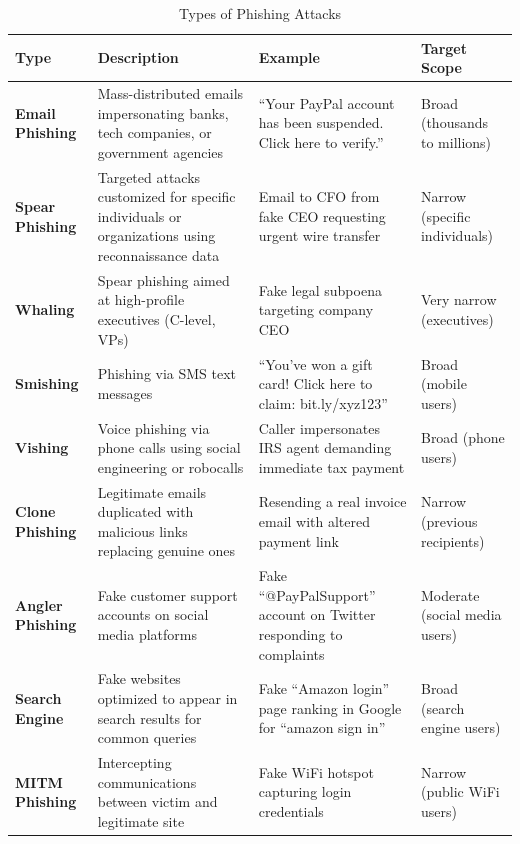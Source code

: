 \setlength{\tabcolsep}{4pt}
\small
\begin{longtable}{
>{\raggedright\arraybackslash}p{}
>{\raggedright\arraybackslash}p{}
>{\raggedright\arraybackslash}p{}
>{\raggedright\arraybackslash}p{}}
\caption{Types of Phishing Attacks} \\
\toprule
Type & Description & Example & Target Scope \\
\midrule

\textbf{Email Phishing} & Mass-distributed emails impersonating banks,
tech companies, or government agencies & ``Your PayPal account has been
suspended. Click here to verify.'' & Broad (thousands to millions) \\
\textbf{Spear Phishing} & Targeted attacks customized for specific
individuals or organizations using reconnaissance data & Email to CFO
from fake CEO requesting urgent wire transfer & Narrow (specific
individuals) \\
\textbf{Whaling} & Spear phishing aimed at high-profile executives
(C-level, VPs) & Fake legal subpoena targeting company CEO & Very narrow
(executives) \\
\textbf{Smishing} & Phishing via SMS text messages & ``You've won a gift
card! Click here to claim: bit.ly/xyz123'' & Broad (mobile users) \\
\textbf{Vishing} & Voice phishing via phone calls using social
engineering or robocalls & Caller impersonates IRS agent demanding
immediate tax payment & Broad (phone users) \\
\textbf{Clone Phishing} & Legitimate emails duplicated with malicious
links replacing genuine ones & Resending a real invoice email with
altered payment link & Narrow (previous recipients) \\
\textbf{Angler Phishing} & Fake customer support accounts on social
media platforms & Fake ``@PayPalSupport'' account on Twitter responding
to complaints & Moderate (social media users) \\
\textbf{Search Engine} & Fake websites optimized to appear in
search results for common queries & Fake ``Amazon login'' page ranking
in Google for ``amazon sign in'' & Broad (search engine users) \\
\textbf{MITM Phishing} & Intercepting communications
between victim and legitimate site & Fake WiFi hotspot capturing login
credentials & Narrow (public WiFi users) \\

\bottomrule
\end{longtable}
\normalsize
\setlength{\tabcolsep}{6pt}

